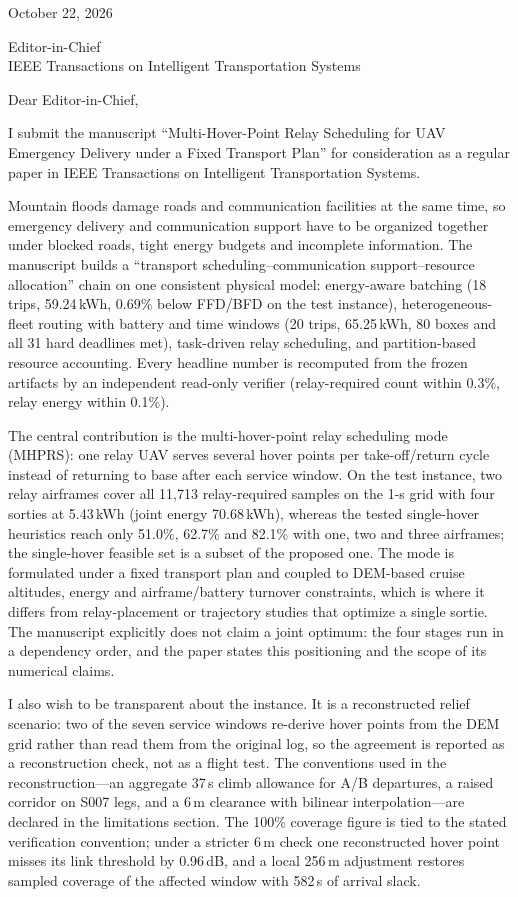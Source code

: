 \documentclass[11pt]{article}
\begin{document}
\begin{flushright}
October 22, 2026
\end{flushright}

Editor-in-Chief\\
IEEE Transactions on Intelligent Transportation Systems

\vspace{6pt}
Dear Editor-in-Chief,

I submit the manuscript ``Multi-Hover-Point Relay Scheduling for UAV
Emergency Delivery under a Fixed Transport Plan'' for consideration as a
regular paper in IEEE Transactions on Intelligent Transportation Systems.

Mountain floods damage roads and communication facilities at the same time, so
emergency delivery and communication support have to be organized together
under blocked roads, tight energy budgets and incomplete information. The
manuscript builds a ``transport scheduling--communication support--resource
allocation'' chain on one consistent physical model: energy-aware batching
(18 trips, 59.24\,kWh, 0.69\% below FFD/BFD on the test instance),
heterogeneous-fleet routing with battery and time windows (20 trips,
65.25\,kWh, 80 boxes and all 31 hard deadlines met), task-driven relay
scheduling, and partition-based resource accounting. Every headline number is
recomputed from the frozen artifacts by an independent read-only verifier
(relay-required count within 0.3\%, relay energy within 0.1\%).

The central contribution is the multi-hover-point relay scheduling mode
(MHPRS): one relay UAV serves several hover points per take-off/return cycle
instead of returning to base after each service window. On the test instance,
two relay airframes cover all 11,713 relay-required samples on the 1-s grid
with four sorties at 5.43\,kWh (joint energy 70.68\,kWh), whereas the tested
single-hover heuristics reach only 51.0\%, 62.7\% and 82.1\% with one, two and
three airframes; the single-hover feasible set is a subset of the proposed one.
The mode is formulated under a fixed transport plan and coupled to DEM-based
cruise altitudes, energy and airframe/battery turnover constraints, which is
where it differs from relay-placement or trajectory studies that optimize a
single sortie. The manuscript explicitly does not claim a joint optimum: the four stages run
in a dependency order, and the paper states this positioning and the scope of
its numerical claims.

I also wish to be transparent about the instance. It is a reconstructed
relief scenario: two of the seven service windows re-derive hover points from
the DEM grid rather than read them from the original log, so the agreement is
reported as a reconstruction check, not as a flight test. The conventions used
in the reconstruction---an aggregate 37\,s climb allowance for A/B departures,
a raised corridor on S007 legs, and a 6\,m clearance with bilinear
interpolation---are declared in the limitations section. The 100\% coverage
figure is tied to the stated verification convention; under a stricter 6\,m
check one reconstructed hover point misses its link threshold by 0.96\,dB, and
a local 256\,m adjustment restores sampled coverage of the affected window with
582\,s of arrival slack.
\end{document}
